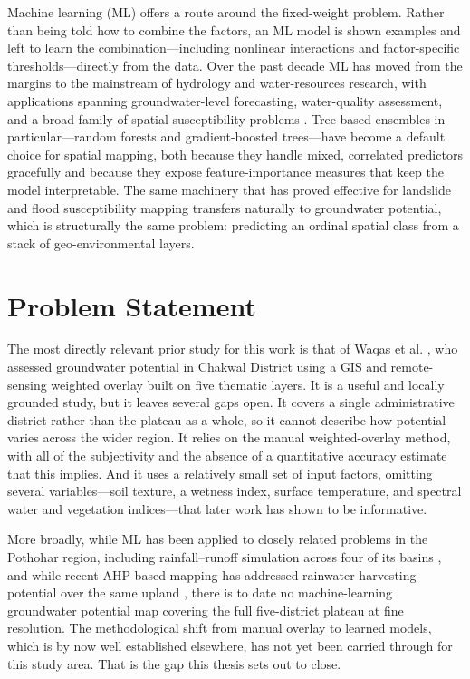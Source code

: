 Machine learning (ML) offers a route around the fixed-weight problem. Rather
than being told how to combine the factors, an ML model is shown examples and
left to learn the combination---including nonlinear interactions and
factor-specific thresholds---directly from the data. Over the past decade ML
has moved from the margins to the mainstream of hydrology and water-resources
research, with applications spanning groundwater-level forecasting, water-quality
assessment, and a broad family of spatial susceptibility problems
\cite{sit2020deeplearning,hai2022gwlreview,zhu2022mlwaterquality}. Tree-based
ensembles in particular---random forests and gradient-boosted trees---have
become a default choice for spatial mapping, both because they handle mixed,
correlated predictors gracefully and because they expose feature-importance
measures that keep the model interpretable. The same machinery that has proved
effective for landslide and flood susceptibility mapping transfers naturally to
groundwater potential, which is structurally the same problem: predicting an
ordinal spatial class from a stack of geo-environmental layers.

\section{Problem Statement}
\label{sec:problem}

The most directly relevant prior study for this work is that of Waqas et al.
\cite{waqas2022chakwal}, who assessed groundwater potential in Chakwal District
using a GIS and remote-sensing weighted overlay built on five thematic layers.
It is a useful and locally grounded study, but it leaves several gaps open.
It covers a single administrative district rather than the plateau as a whole,
so it cannot describe how potential varies across the wider region. It relies
on the manual weighted-overlay method, with all of the subjectivity and the
absence of a quantitative accuracy estimate that this implies. And it uses a
relatively small set of input factors, omitting several variables---soil
texture, a wetness index, surface temperature, and spectral water and
vegetation indices---that later work has shown to be informative.

More broadly, while ML has been applied to closely related problems in the
Pothohar region, including rainfall--runoff simulation across four of its basins
\cite{khan2023rainfallrunoff}, and while recent AHP-based mapping has addressed
rainwater-harvesting potential over the same upland \cite{hafeez2025rwh}, there
is to date no machine-learning groundwater potential map covering the full
five-district plateau at fine resolution. The methodological shift from manual
overlay to learned models, which is by now well established elsewhere, has not
yet been carried through for this study area. That is the gap this thesis sets
out to close.


